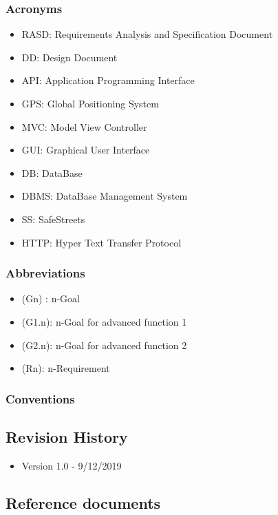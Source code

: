 \subsubsection{Acronyms}
\begin{itemize}
	\item RASD: Requirements Analysis and Specification Document
	\item DD: Design Document
	\item API: Application Programming Interface
	\item GPS: Global Positioning System
	\item MVC: Model View Controller
	\item GUI: Graphical User Interface
	\item DB: DataBase
	\item DBMS: DataBase Management System
	\item SS: SafeStreets
	\item HTTP: Hyper Text Transfer Protocol
\end{itemize}
\subsubsection{Abbreviations}
\begin{itemize}
	\item (Gn) : n-Goal
	\item (G1.n): n-Goal for advanced function 1
	\item (G2.n): n-Goal for advanced function 2
	\item (Rn): n-Requirement
\end{itemize}
\subsubsection{Conventions}
\subsection{Revision History}
\begin{itemize}
	\item Version 1.0 - 9/12/2019
\end{itemize}
\subsection{Reference documents}
